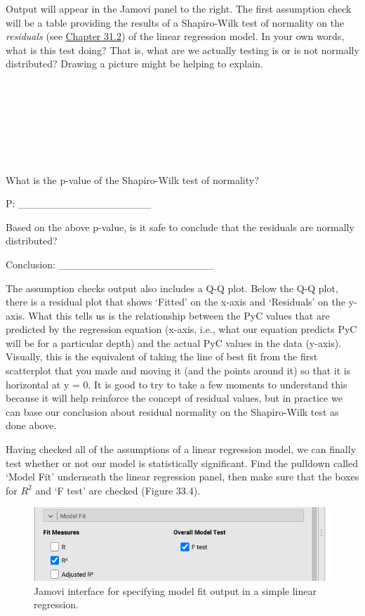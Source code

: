 \documentclass[
]{scrbook}
\begin{document}
Output will appear in the Jamovi panel to the right.
The first assumption check will be a table providing the results of a Shapiro-Wilk test of normality on the \emph{residuals} (see \protect\hyperlink{intercepts-slopes-and-residuals}{Chapter 31.2}) of the linear regression model.
In your own words, what is this test doing?
That is, what are we actually testing is or is not normally distributed?
Drawing a picture might be helping to explain.

\begin{verbatim}







\end{verbatim}

What is the p-value of the Shapiro-Wilk test of normality?

P: \_\_\_\_\_\_\_\_\_\_\_\_\_\_\_\_\_\_

Based on the above p-value, is it safe to conclude that the residuals are normally distributed?

Conclusion: \_\_\_\_\_\_\_\_\_\_\_\_\_\_\_\_\_\_\_\_\_

The assumption checks output also includes a Q-Q plot.
Below the Q-Q plot, there is a residual plot that shows `Fitted' on the x-axis and `Residuals' on the y-axis.
What this tells us is the relationship between the PyC values that are predicted by the regression equation (x-axis, i.e., what our equation predicts PyC will be for a particular depth) and the actual PyC values in the data (y-axis).
Visually, this is the equivalent of taking the line of best fit from the first scatterplot that you made and moving it (and the points around it) so that it is horizontal at y = 0.
It is good to try to take a few moments to understand this because it will help reinforce the concept of residual values, but in practice we can base our conclusion about residual normality on the Shapiro-Wilk test as done above.

Having checked all of the assumptions of a linear regression model, we can finally test whether or not our model is statistically significant.
Find the pulldown called `Model Fit' underneath the linear regression panel, then make sure that the boxes for \(R^{2}\) and `F test' are checked (Figure 33.4).

\begin{figure}
\includegraphics[width=1\linewidth]{img/Jamovi_linear_regression_model_fit} \caption{Jamovi interface for specifying model fit output in a simple linear regression.}\label{fig:unnamed-chunk-177}
\end{figure}
\end{document}
